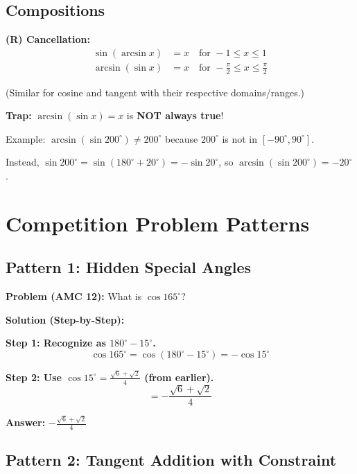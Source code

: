 \documentclass[12pt]{extarticle}
\begin{document}
\subsection{Compositions}

\begin{conceptbox}
\textbf{(R) Cancellation:}
\begin{align*}
\sin(\arcsin x) &= x \quad \text{for } -1 \le x \le 1 \\
\arcsin(\sin x) &= x \quad \text{for } -\frac{\pi}{2} \le x \le \frac{\pi}{2}
\end{align*}

(Similar for cosine and tangent with their respective domains/ranges.)
\end{conceptbox}

\begin{warningbox}
\textbf{Trap:} $\arcsin(\sin x) = x$ is \textbf{NOT always true}!

Example: $\arcsin(\sin 200^\circ) \ne 200^\circ$ because $200^\circ$ is not in $\left[-90^\circ, 90^\circ\right]$.

Instead, $\sin 200^\circ = \sin(180^\circ + 20^\circ) = -\sin 20^\circ$, so $\arcsin(\sin 200^\circ) = -20^\circ$.
\end{warningbox}

\section{Competition Problem Patterns}

\subsection{Pattern 1: Hidden Special Angles}

\begin{examplebox}
\textbf{Problem (AMC 12):} What is $\cos 165^\circ$?

\textbf{Solution (Step-by-Step):}

\textbf{Step 1: Recognize as $180^\circ - 15^\circ$.}
\[
\cos 165^\circ = \cos(180^\circ - 15^\circ) = -\cos 15^\circ
\]

\textbf{Step 2: Use $\cos 15^\circ = \frac{\sqrt{6} + \sqrt{2}}{4}$ (from earlier).}
\[
= -\frac{\sqrt{6} + \sqrt{2}}{4}
\]

\textbf{Answer:} $\boxed{-\frac{\sqrt{6} + \sqrt{2}}{4}}$
\end{examplebox}

\subsection{Pattern 2: Tangent Addition with Constraint}
\end{document}
